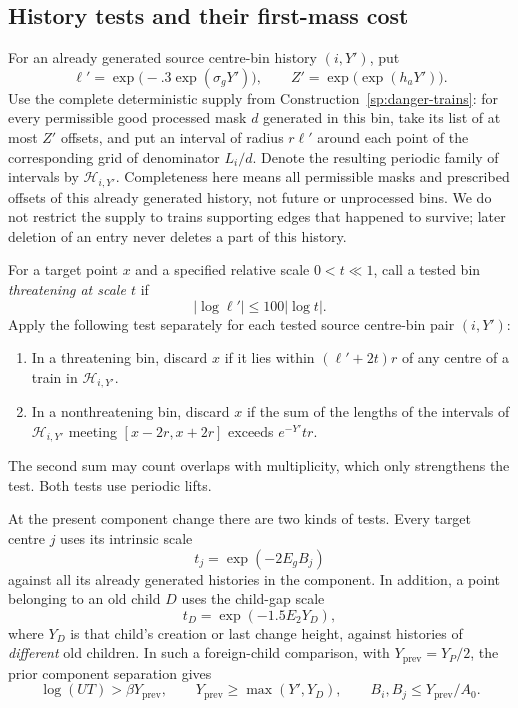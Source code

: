\subsection{History tests and their first-mass cost}

For an already generated source centre-bin history $(i,Y')$, put
\[
 \ell'=\exp\bigl(-.3\exp(\sigma_gY')\bigr),
 \qquad Z'=\exp\bigl(\exp(h_aY')\bigr).
\]
Use the complete deterministic supply from
Construction~\ref{sp:danger-trains}: for every permissible good
processed mask $d$ generated in this bin, take its list of at most
$Z'$ offsets, and put an interval of radius $r\ell'$ around each
point of the corresponding grid of denominator $L_i/d$.  Denote the
resulting periodic family of intervals by $\mathcal H_{i,Y'}$.
Completeness here means all permissible masks and prescribed offsets
of this already generated history, not future or unprocessed bins.
We do not restrict the supply to trains supporting edges that
happened to survive; later deletion of an entry never deletes a
part of this history.

For a target point $x$ and a specified relative scale $0<t\ll1$,
call a tested bin \emph{threatening at scale $t$} if
\[
 |\log\ell'|\le 100|\log t|.
\]
Apply the following test separately for each tested source
centre-bin pair $(i,Y')$:
\begin{enumerate}
 \item In a threatening bin, discard $x$ if it lies within
 $(\ell'+2t)r$ of any centre of a train in
 $\mathcal H_{i,Y'}$.
 \item In a nonthreatening bin, discard $x$ if the sum of the lengths
 of the intervals of $\mathcal H_{i,Y'}$ meeting
 $[x-2r,x+2r]$ exceeds $e^{-Y'}tr$.
\end{enumerate}
The second sum may count overlaps with multiplicity, which only
strengthens the test.  Both tests use periodic lifts.

At the present component change there are two kinds of tests.  Every
target centre $j$ uses its intrinsic scale
\[
 t_j=\exp(-2E_gB_j)
\]
against all its already generated histories in the component.  In
addition, a point belonging to an old child $D$ uses the child-gap
scale
\[
 t_D=\exp(-1.5E_2Y_D),
\]
where $Y_D$ is that child's creation or last change height, against
histories of \emph{different} old children.  In such a foreign-child
comparison, with $Y_{\mathrm{prev}}=Y_P/2$, the prior component
separation gives
\begin{equation}
 \log(UT)>\beta Y_{\mathrm{prev}},
 \qquad
 Y_{\mathrm{prev}}\ge\max(Y',Y_D),
 \qquad B_i,B_j\le Y_{\mathrm{prev}}/A_0.
\label{part:foreign-separation}
\end{equation}

